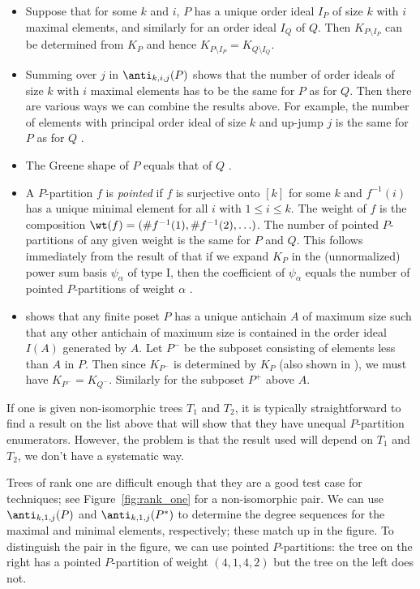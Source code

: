 \begin{itemize}
\item Suppose that for some $k$ and $i$, $P$ has a unique order ideal $I_P$ of size $k$ with $i$ maximal elements, and similarly for an order ideal $I_Q$ of $Q$.  Then $K_{P\setminus I_P}$ can be determined from $K_P$ \cite[Corollary 3.6]{LiWe20} and hence $K_{P\setminus I_P} = K_{Q \setminus I_Q}$.

\item Summing over $j$ in $\anti_{k,i,j}(P)$ shows that the number of order ideals of size $k$ with $i$ maximal elements has to be the same for $P$ as for $Q$.  Then there are various ways we can combine the results above.  For example, the number of elements with principal order ideal of size $k$ and up-jump $j$ is the same for $P$ as for $Q$ \cite{LiWe20}.

\item The Greene shape of $P$ equals that of $Q$ \cite{LiWe20}.

\item A $P$-partition $f$ is \emph{pointed} if $f$ is surjective onto $[k]$ for some $k$ and $f^{-1}(i)$ has a unique minimal element for all $i$ with $1 \leq i \leq k$.  The weight of $f$ is the composition $\wt(f) = (\#f^{-1}(1), \#f^{-1}(2), \ldots)$.  The number of pointed $P$-partitions of any given weight is the same for $P$ and $Q$.  This follows immediately from the result of \cite{AlSu21} that if we expand $K_P$ in the (unnormalized) power sum basis $\psi_\alpha$ of type I, then the coefficient of $\psi_\alpha$ equals the number of pointed $P$-partitions of weight $\alpha$ .

\item \cite[Lemma~4.10]{LiWe20} shows that any finite poset $P$ has a unique antichain $A$ of maximum size such that any other antichain of maximum size is contained in the order ideal $I(A)$ generated by $A$.  Let $P^-$ be the subposet consisting of elements less than $A$ in $P$.  Then since $K_{P^-}$ is determined by $K_P$ (also shown in \cite{LiWe20}), we must have $K_{P^-} = K_{Q^-}$.  Similarly for the subposet $P^+$ above $A$.
\end{itemize}

If one is given non-isomorphic trees $T_1$ and $T_2$, it is typically straightforward to find a result on the list above that will show that they have unequal $P$-partition enumerators.  However, the problem is that the result used will depend on $T_1$ and $T_2$, \ie we don't have a systematic way.

Trees of rank one are difficult enough that they are a good test case for techniques; see Figure~\ref{fig:rank_one} for a non-isomorphic pair.  We can use $\anti_{k,1,j}(P)$ and $ \anti_{k,1,j}(P^*)$ to determine the degree sequences for the maximal and minimal elements, respectively; these match up in the figure.  To distinguish the pair in the figure, we can use pointed $P$-partitions: the tree on the right has a pointed $P$-partition of weight $(4,1,4,2)$ but the tree on the left does not.

